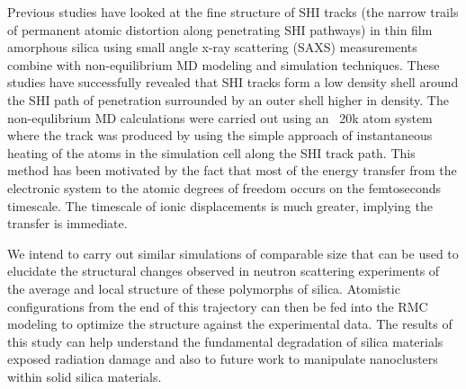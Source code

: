 Previous studies have looked at the fine structure of SHI tracks (the narrow trails of permanent atomic distortion along penetrating SHI pathways) in thin film amorphous silica using small angle x-ray scattering (SAXS) measurements combine with non-equilibrium MD modeling and simulation techniques. These studies have successfully revealed that SHI tracks form a low density shell around the SHI path of penetration surrounded by an outer shell higher in density. The non-equlibrium MD calculations were carried out using an ~20k atom system where the track was produced by using the simple approach of instantaneous heating of  the atoms in the simulation cell along the SHI track path. This method has been motivated by the fact that most of the energy transfer from the electronic system to the atomic degrees of freedom occurs on the femtoseconds timescale.  The timescale of ionic displacements is much greater, implying the transfer is immediate. 

We intend to carry out similar simulations of comparable size that can be used to elucidate the structural changes observed in neutron scattering experiments of the average and local structure of these polymorphs of silica. Atomistic configurations from the end of this trajectory can then be fed into the RMC modeling to optimize the structure against the experimental data. The results of this study can help understand the fundamental degradation of silica materials exposed radiation damage and also to future work to manipulate nanoclusters within solid silica materials. 

